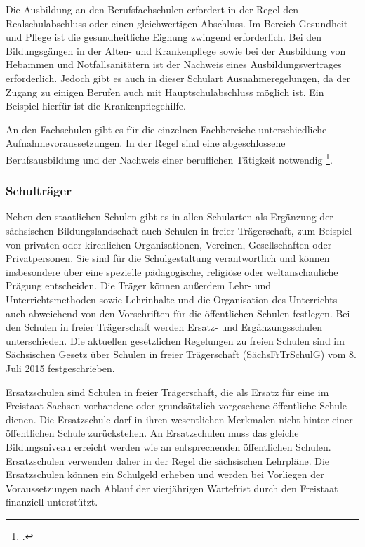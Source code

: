 Die Ausbildung an den Berufsfachschulen erfordert in der Regel den Realschulabschluss oder einen gleichwertigen Abschluss. Im Bereich Gesundheit und Pflege ist die gesundheitliche Eignung zwingend erforderlich. Bei den Bildungsgängen in der Alten- und Krankenpflege sowie bei der Ausbildung von Hebammen und Notfallsanitätern ist der Nachweis eines Ausbildungsvertrages erforderlich. Jedoch gibt es auch in dieser Schulart Ausnahmeregelungen, da der Zugang zu einigen Berufen auch mit Hauptschulabschluss möglich ist. Ein Beispiel hierfür ist die Krankenpflegehilfe.
 
An den Fachschulen gibt es für die einzelnen Fachbereiche unterschiedliche Aufnahmevoraussetzungen. In der Regel sind eine abgeschlossene Berufsausbildung und der Nachweis einer beruflichen Tätigkeit notwendig \footcite[vgl.][15ff]{SMKSK2013}.

\subsubsection{Schulträger}
\label{sec:Schulträger}

Neben den staatlichen Schulen gibt es in allen Schularten als Ergänzung der sächsischen Bildungslandschaft auch Schulen in freier Trägerschaft, zum Beispiel von privaten oder kirchlichen Organisationen, Vereinen, Gesellschaften oder Privatpersonen. Sie sind für die Schulgestaltung verantwortlich und können insbesondere über eine spezielle pädagogische, religiöse oder weltanschauliche Prägung entscheiden. Die Träger können außerdem Lehr- und Unterrichtsmethoden sowie Lehrinhalte und die Organisation des Unterrichts auch abweichend von den Vorschriften für die öffentlichen Schulen festlegen. Bei den Schulen in freier Trägerschaft werden Ersatz- und Ergänzungsschulen unterschieden. Die aktuellen gesetzlichen Regelungen zu freien Schulen sind im Sächsischen Gesetz über Schulen in freier Trägerschaft (SächsFrTrSchulG) vom 8. Juli 2015 festgeschrieben.

Ersatzschulen sind Schulen in freier Trägerschaft, die als Ersatz für eine im Freistaat Sachsen vorhandene oder grundsätzlich vorgesehene öffentliche Schule dienen. Die Ersatzschule darf in ihren wesentlichen Merkmalen nicht hinter einer öffentlichen Schule zurückstehen. An Ersatzschulen muss das gleiche Bildungsniveau erreicht werden wie an entsprechenden öffentlichen Schulen. Ersatzschulen verwenden daher in der Regel die sächsischen Lehrpläne. Die Ersatzschulen können ein Schulgeld erheben und werden bei Vorliegen der Voraussetzungen nach Ablauf der vierjährigen Wartefrist durch den Freistaat finanziell unterstützt. 

